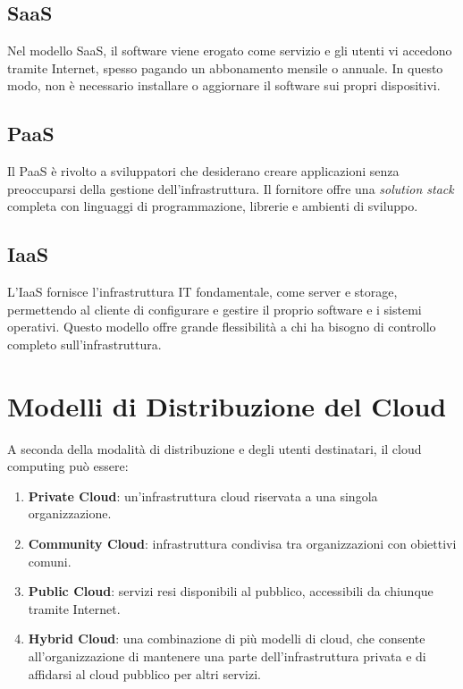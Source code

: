 \documentclass[12pt]{report}
\begin{document}
	\subsection{SaaS}
	Nel modello SaaS, il software viene erogato come servizio e gli utenti vi accedono tramite Internet, spesso pagando un abbonamento mensile o annuale. In questo modo, non è necessario installare o aggiornare il software sui propri dispositivi.

	\subsection{PaaS}
	Il PaaS è rivolto a sviluppatori che desiderano creare applicazioni senza preoccuparsi della gestione dell’infrastruttura. Il fornitore offre una \textit{solution stack} completa con linguaggi di programmazione, librerie e ambienti di sviluppo.

	\subsection{IaaS}
	L’IaaS fornisce l’infrastruttura IT fondamentale, come server e storage, permettendo al cliente di configurare e gestire il proprio software e i sistemi operativi. Questo modello offre grande flessibilità a chi ha bisogno di controllo completo sull’infrastruttura.

	\section{Modelli di Distribuzione del Cloud}
	A seconda della modalità di distribuzione e degli utenti destinatari, il cloud computing può essere:
	\begin{enumerate}
		\item \textbf{Private Cloud}: un'infrastruttura cloud riservata a una singola organizzazione.
		\item \textbf{Community Cloud}: infrastruttura condivisa tra organizzazioni con obiettivi comuni.
		\item \textbf{Public Cloud}: servizi resi disponibili al pubblico, accessibili da chiunque tramite Internet.
		\item \textbf{Hybrid Cloud}: una combinazione di più modelli di cloud, che consente all’organizzazione di mantenere una parte dell’infrastruttura privata e di affidarsi al cloud pubblico per altri servizi.
	\end{enumerate}
\end{document}
